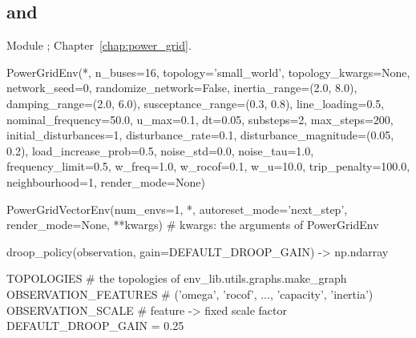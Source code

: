 \subsection{\texorpdfstring{ and }{PowerGridEnv and PowerGridVectorEnv}}

Module ; Chapter~\ref{chap:power_grid}.

\begin{pycode}
PowerGridEnv(*, n_buses=16, topology='small_world', topology_kwargs=None,
             network_seed=0, randomize_network=False, inertia_range=(2.0, 8.0),
             damping_range=(2.0, 6.0), susceptance_range=(0.3, 0.8),
             line_loading=0.5, nominal_frequency=50.0, u_max=0.1, dt=0.05,
             substeps=2, max_steps=200, initial_disturbances=1,
             disturbance_rate=0.1, disturbance_magnitude=(0.05, 0.2),
             load_increase_prob=0.5, noise_std=0.0, noise_tau=1.0,
             frequency_limit=0.5, w_freq=1.0, w_rocof=0.1, w_u=10.0,
             trip_penalty=100.0, neighbourhood=1, render_mode=None)

PowerGridVectorEnv(num_envs=1, *, autoreset_mode='next_step', render_mode=None,
                   **kwargs)             # kwargs: the arguments of PowerGridEnv

droop_policy(observation, gain=DEFAULT_DROOP_GAIN) -> np.ndarray

TOPOLOGIES              # the topologies of env_lib.utils.graphs.make_graph
OBSERVATION_FEATURES    # ('omega', 'rocof', ..., 'capacity', 'inertia')
OBSERVATION_SCALE       # feature -> fixed scale factor
DEFAULT_DROOP_GAIN = 0.25
\end{pycode}

